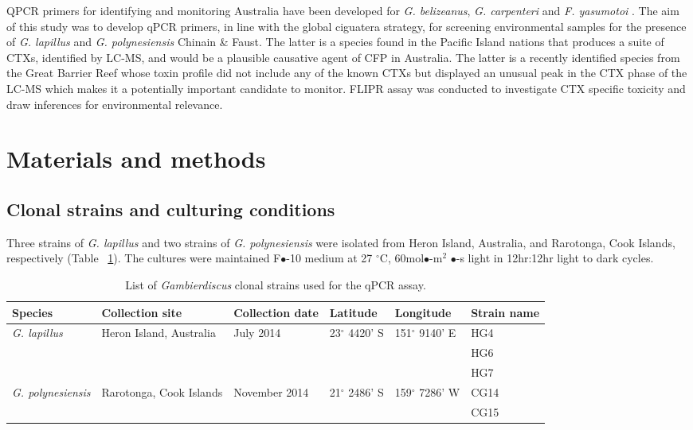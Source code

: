 \documentclass[12pt]{article}
\begin{document}
QPCR primers for identifying and monitoring Australia have been developed for \emph{G. belizeanus}, \emph{G. carpenteri} and \emph{F. yasumotoi} \citep{nishimura2016quantitative,vandersea2012development}.
The aim of this study was to develop qPCR primers, in line with the global ciguatera strategy, for screening environmental samples for the presence of \emph{G. lapillus} and \emph{G. polynesiensis} Chinain \& Faust. The latter is a species found in the Pacific Island nations that produces a suite of CTXs, identified by LC-MS, and would be a plausible causative agent of CFP in Australia. The latter is a recently identified species from the Great Barrier Reef whose toxin profile did not include any of the known CTXs but displayed an unusual peak in the CTX phase of the LC-MS which makes it a potentially important candidate to monitor. FLIPR assay was conducted to investigate CTX specific toxicity and draw inferences for environmental relevance.
\newpage
\section{Materials and methods}
\subsection{Clonal strains and culturing conditions}
Three strains of \emph{G. lapillus} and two strains of \emph{G. polynesiensis} were isolated from Heron Island, Australia, and Rarotonga, Cook Islands, respectively (Table ~\ref{tbl:StrainTable}). The cultures were maintained F$\bullet$-10 medium at 27 $^{\circ}$C, 60mol$\bullet$-m$^{2}$ $\bullet$-s light in 12hr:12hr light to dark cycles.
\FloatBarrier
\begin{table}
\caption{List of \emph{Gambierdiscus} clonal strains used for the qPCR assay.}
\label{tbl:StrainTable}
\begin{tabular}{ | p{2cm} | p{2cm} | p{2cm}| p{3cm} | p{3cm} | p{2cm} | }
\hline
\textbf{Species} & \textbf{Collection site} & \textbf{Collection date} &\textbf{Latitude} & \textbf{Longitude} & \textbf{Strain name} \\
\hline
\emph{G. lapillus} &Heron Island, Australia &July 2014 &23$^{\circ}$ 4420' S&151$^{\circ}$ 9140' E & HG4 \\
\hline
&&&&& HG6\\
\hline
&&&& &HG7\\
\hline
\emph{G. polynesiensis}&Rarotonga, Cook Islands&November 2014 &21$^{\circ}$ 2486' S&159$^{\circ}$ 7286' W & CG14 \\
\hline
&&&&&CG15\\
\hline
\end{tabular}
\end{table}
\end{document}
